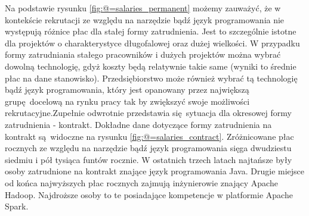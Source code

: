 \newline Na podstawie rysunku \ref{fig:@=salaries_permanent} możemy zauważyć, że w kontekście rekrutacji ze względu na narzędzie bądź język programowania nie występują różnice płac dla stałej formy zatrudnienia. Jest to szczególnie istotne dla projektów o charakterystyce długofalowej oraz dużej wielkości. W przypadku formy zatrudniania stałego pracowników i dużych projektów można wybrać dowolną technologię, gdyż koszty będą relatywnie takie same (wyniki to średnie płac na dane stanowisko). Przedsiębiorstwo może również wybrać tą technologię bądź język programowania, który jest opanowany przez największą grupę docelową na rynku pracy tak by zwiększyć swoje możliwości rekrutacyjne.\newline Zupełnie odwrotnie przedstawia się sytuacja dla okresowej formy zatrudnienia - kontrakt. Dokładne dane dotyczące formy zatrudnienia na kontrakt są widoczne na rysunku \ref{fig:@=salaries_contract}. Zróżnicowane płac rocznych ze względu na narzędzie bądź język programowania sięga dwudziestu siedmiu i pół tysiąca funtów rocznie. W ostatnich trzech latach najtańsze były osoby zatrudnione na kontrakt znające język programowania Java. Drugie miejsce od końca najwyższych płac rocznych zajmują inżynierowie znający Apache Hadoop. Najdroższe osoby to te posiadające kompetencje w platformie Apache Spark. 